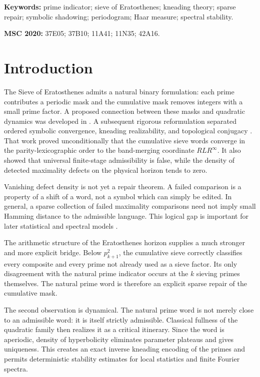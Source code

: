 \documentclass[11pt]{article}
\theoremstyle{definition}
\theoremstyle{remark}
\begin{document}
\noindent\textbf{Keywords:} prime indicator; sieve of Eratosthenes; kneading theory; sparse repair; symbolic shadowing; periodogram; Haar measure; spectral stability.

\medskip
\noindent\textbf{MSC 2020:} 37E05; 37B10; 11A41; 11N35; 42A16.

\section{Introduction}

The Sieve of Eratosthenes admits a natural binary formulation: each prime contributes a periodic mask and the cumulative mask removes integers with a small prime factor.  A proposed connection between these masks and quadratic dynamics was developed in \citet{Wang2026Published}.  A subsequent rigorous reformulation separated ordered symbolic convergence, kneading realizability, and topological conjugacy \citep{WangReformulation2026}.  That work proved unconditionally that the cumulative sieve words converge in the parity-lexicographic order to the band-merging coordinate $RLR^\infty$.  It also showed that universal finite-stage admissibility is false, while the density of detected maximality defects on the physical horizon tends to zero.

Vanishing defect density is not yet a repair theorem.  A failed comparison is a property of a shift of a word, not a symbol which can simply be edited.  In general, a sparse collection of failed maximality comparisons need not imply small Hamming distance to the admissible language.  This logical gap is important for later statistical and spectral models \citep{WangSequential2026,WangSpectral2026,WangHenon2026}.

The arithmetic structure of the Eratosthenes horizon supplies a much stronger and more explicit bridge.  Below $p_{k+1}^2$, the cumulative sieve correctly classifies every composite and every prime not already used as a sieve factor.  Its only disagreement with the natural prime indicator occurs at the $k$ sieving primes themselves.  The natural prime word is therefore an explicit sparse repair of the cumulative mask.

The second observation is dynamical.  The natural prime word is not merely close to an admissible word: it is itself strictly admissible.  Classical fullness of the quadratic family then realizes it as a critical itinerary.  Since the word is aperiodic, density of hyperbolicity eliminates parameter plateaus and gives uniqueness.  This creates an exact inverse kneading encoding of the primes and permits deterministic stability estimates for local statistics and finite Fourier spectra.
\end{document}
